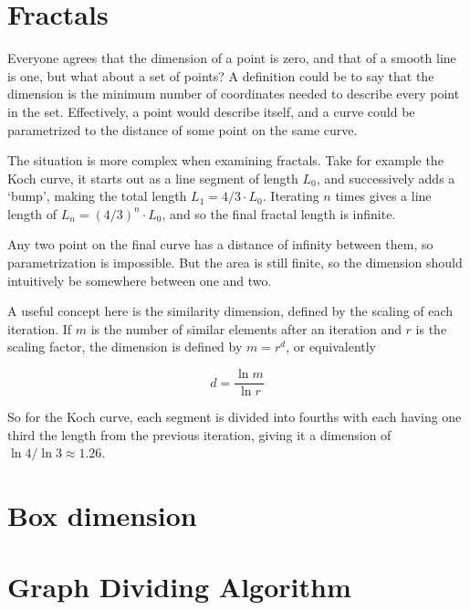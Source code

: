 \section{Fractals}
\label{sec:fractals}

Everyone agrees that the dimension of a point is zero, and that of a smooth line is one, but what about a set of points? A definition could be to say that the dimension is the minimum number of coordinates needed to describe every point in the set. Effectively, a point would describe itself, and a curve could be parametrized to the distance of some point on the same curve.

The situation is more complex when examining fractals. Take for example the Koch curve, it starts out as a line segment of length $L_0$, and successively adds a `bump', making the total length $L_1 = 4/3 \cdot L_0$. Iterating $n$ times gives a line length of $L_n = {(4 / 3)}^n \cdot L_0$, and so the final fractal length is infinite.

Any two point on the final curve has a distance of infinity between them, so parametrization is impossible. But the area is still finite, so the dimension should intuitively be somewhere between one and two.

A useful concept here is the similarity dimension, defined by the scaling of each iteration. If $m$ is the number of similar elements after an iteration and $r$ is the scaling factor, the dimension is defined by $m = r^d$, or equivalently

\begin{equation}
	d = \frac{\ln m}{\ln r}
\end{equation}

So for the Koch curve, each segment is divided into fourths with each having one third the length from the previous iteration, giving it a dimension of $\ln 4 / \ln 3 \approx 1.26$.


\section{Box dimension}
\label{sec:boxdimension}

\section{Graph Dividing Algorithm}
\label{sec:GraphDivisonAlgorithm}

